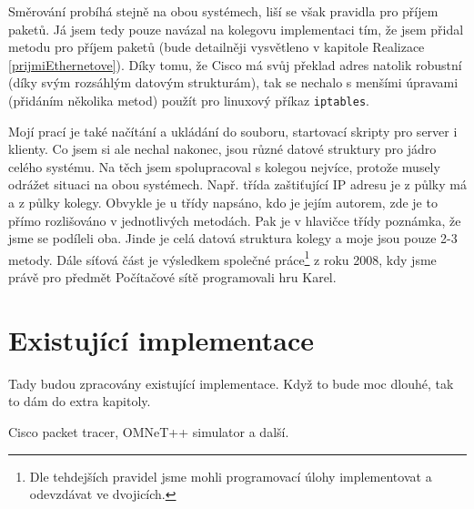 Směrování probíhá stejně na obou systémech, liší se však pravidla pro příjem paketů. Já jsem tedy pouze navázal na kolegovu implementaci tím, že jsem přidal metodu pro příjem paketů (bude detailněji vysvětleno v kapitole Realizace \ref{prijmiEthernetove}). Díky tomu, že Cisco má svůj překlad adres natolik robustní (díky svým rozsáhlým datovým strukturám), tak se nechalo s menšími úpravami (přidáním několika metod) použít pro linuxový příkaz \verb|iptables|. 

Mojí prací je také načítání a ukládání do souboru, startovací skripty pro server i klienty. Co jsem si ale nechal nakonec, jsou různé datové struktury pro jádro celého systému. Na těch jsem spolupracoval s kolegou nejvíce, protože musely odrážet situaci na obou systémech. Např. třída zaštiťující IP adresu je z půlky má a z půlky kolegy. Obvykle je u třídy napsáno, kdo je jejím autorem, zde je to přímo rozlišováno v jednotlivých metodách. Pak je v hlavičce třídy poznámka, že jsme se podíleli oba. Jinde je celá datová struktura kolegy a moje jsou pouze 2-3 metody. Dále síťová část je výsledkem společné práce\footnote{Dle tehdejších pravidel jsme mohli programovací úlohy implementovat a odevzdávat ve dvojicích.} z roku 2008, kdy jsme právě pro předmět Počítačové sítě programovali hru Karel.

\section{Existující implementace}
Tady budou zpracovány existující implementace. Když to bude moc dlouhé, tak to dám do extra kapitoly.

Cisco packet tracer, OMNeT++ simulator a další.









